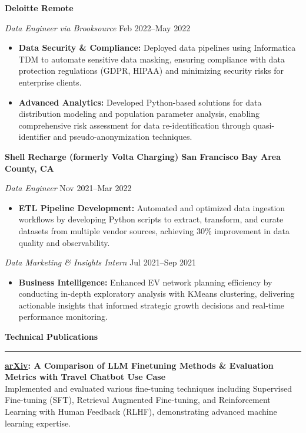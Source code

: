 \documentclass[letterpaper,10pt]{article}
\newcommand{\resumesection}[1]{
  \vspace{4pt}
  \noindent\textbf{\Large #1} \\
  \noindent\rule{\linewidth}{0.2pt}
  \vspace{-4pt}
}
\begin{document}
\textbf{Deloitte \hfill Remote}\par
\textit{Data Engineer via Brooksource} \hfill  Feb 2022--May 2022
\begin{itemize}[leftmargin=0.15in, itemsep=0pt, parsep=0pt, topsep=0pt]
    \item \textbf{Data Security \& Compliance:} Deployed data pipelines using Informatica TDM to automate sensitive data masking, ensuring compliance with data protection regulations (GDPR, HIPAA) and minimizing security risks for enterprise clients.
    \item \textbf{Advanced Analytics:} Developed Python-based solutions for data distribution modeling and population parameter analysis, enabling comprehensive risk assessment for data re-identification through quasi-identifier and pseudo-anonymization techniques.
\end{itemize}

\textbf{Shell Recharge (formerly Volta Charging) \hfill San Francisco Bay Area County, CA}\par
\textit{Data Engineer} \hfill Nov 2021--Mar 2022
\begin{itemize}[leftmargin=0.15in, itemsep=0pt, parsep=0pt, topsep=0pt]
    \item \textbf{ETL Pipeline Development:} Automated and optimized data ingestion workflows by developing Python scripts to extract, transform, and curate datasets from multiple vendor sources, achieving 30\% improvement in data quality and observability.
\end{itemize}

\textit{Data Marketing \& Insights Intern} \hfill Jul 2021--Sep 2021
\begin{itemize}[leftmargin=0.15in, itemsep=0pt, parsep=0pt, topsep=0pt]
    \item \textbf{Business Intelligence:} Enhanced EV network planning efficiency by conducting in-depth exploratory analysis with KMeans clustering, delivering actionable insights that informed strategic growth decisions and real-time performance monitoring.
\end{itemize}

\resumesection{Technical Publications}

\textbf{\href{https://arxiv.org/abs/2408.03562}{arXiv}: A Comparison of LLM Finetuning Methods \& Evaluation Metrics with Travel Chatbot Use Case} \\
Implemented and evaluated various fine-tuning techniques including Supervised Fine-tuning (SFT), Retrieval Augmented Fine-tuning, and Reinforcement Learning with Human Feedback (RLHF), demonstrating advanced machine learning expertise.
\end{document}
